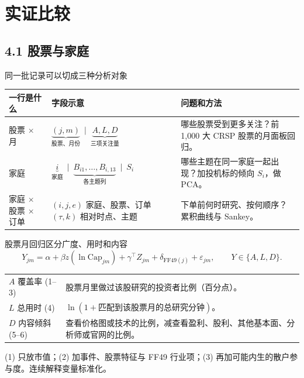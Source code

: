 \section{实证比较}

\subsection{4.1 股票与家庭}
\begin{frame}[label=slices]{同一批记录可以切成三种分析对象}
  \small
  \begin{tabularx}{\linewidth}{@{}L{.24\linewidth}YY@{}}
    \toprule 一行是什么 & 字段示意 & 问题和方法\\\midrule
    股票 \(\times\) 月 & \(\underbrace{(j,m)}_{\text{股票、月份}}\ \mid\ \underbrace{A,L,D}_{\text{三项关注量}}\) &
      哪些股票受到更多关注？前 1,000 大 CRSP 股票的月面板回归。\\\midrule
    家庭 & \(\underbrace{i}_{\text{家庭}}\ \mid\ \underbrace{B_{i1},\ldots,B_{i,13}}_{\text{各主题列}}\ \mid\ S_i\) &
      哪些主题在同一家庭一起出现？加投机标的倾向 \(S_i\)，做 PCA。\\\midrule
    家庭 \(\times\) 股票 \(\times\) 订单 &
      \((i,j,e)\) 家庭、股票、订单\newline \((\tau,k)\) 相对时点、主题 &
      下单前何时研究、按何顺序？累积曲线与 Sankey。\\
    \bottomrule
  \end{tabularx}
\end{frame}

\begin{frame}[label=design]{股票月回归区分广度、用时和内容}
  \[
    Y_{jm}=\alpha+\beta z(\ln \mathrm{Cap}_{jm})+\gamma^\top Z_{jm}
               +\delta_{\mathrm{FF49}(j)}+\varepsilon_{jm},
    \qquad Y \in \{A,L,D\}.
  \]
  \small
  \begin{tabularx}{\linewidth}{@{}L{.25\linewidth}Y@{}}
    \toprule \(A\) 覆盖率 (1--3) & 股票月里做过该股研究的投资者比例（百分点）。\\
    \(L\) 总用时 (4) & \(\ln(1+\text{匹配到该股票月的总研究分钟})\)。\\
    \(D\) 内容倾斜 (5--6) & 查看价格图或技术的比例，减查看盈利、股利、其他基本面、分析师或官网的比例。\\\bottomrule
  \end{tabularx}
  \medskip
  {\small (1) 只放市值；(2) 加事件、股票特征与 FF49 行业项；(3) 再加可能内生的散户参与度。连续解释变量标准化。}
  \scriptsize{}
\end{frame}

